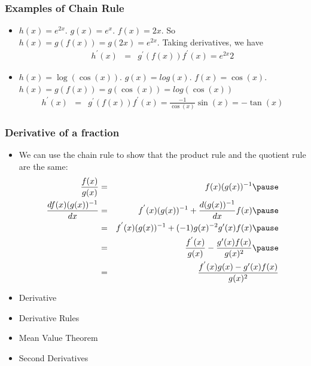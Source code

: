 \documentclass{beamer}
\numberwithin{equation}{section}
\begin{document}
\begin{frame}
\frametitle{Examples of Chain Rule}
\begin{itemize}
\item[-] $h(x) = e^{2x}$.  $g(x) = e^{x}$.  $f(x) = 2x$.  \pause So $h(x) = g(f(x)) = g(2x) = e^{2x}$.  Taking derivatives, we have \pause
\begin{eqnarray}
h^{'}(x) & = & g^{'}(f(x))f^{'}(x) = e^{2x}2 \nonumber 
\end{eqnarray} \pause
\item[-] $h(x) = \log(\cos(x) )$.  $g(x) = log(x)$.  $f(x) = \cos(x)$. \pause\\
 $h(x) = g(f(x)) = g( \cos(x)) = log(\cos(x))$  \pause
\begin{eqnarray}
h^{'}(x) & = & g^{'}(f(x))f^{'}(x) = \frac{-1}{\cos(x)} \sin(x) = -\tan (x) \nonumber 
\end{eqnarray}
\end{itemize}

\end{frame}

\begin{frame}
\frametitle{Derivative of a fraction}

\begin{itemize}
\item We can use the chain rule to show that the product rule and the quotient rule are the same:
\begin{eqnarray}
\frac{f(x) }{g(x) }& = &f(x) (g(x))^{-1} \nonumber \pause\\
 \frac{d f(x) (g(x))^{-1}}{dx}& = & f^{'}(x) (g(x))^{-1} +\frac{d(g(x))^{-1}}{dx} f(x)\nonumber  \pause\\
& = & f^{'}(x) (g(x))^{-1} +(-1)g(x)^{-2}g'(x) f(x) \nonumber  \pause\\
    & = & \frac{f^{'}(x)}{ g(x)} - \frac{g'(x) f(x)}{g(x)^{2}} \nonumber  \pause\\
        & = & \frac{f^{'}(x)g(x)-g'(x) f(x)}{g(x)^{2}} \nonumber 
  \end{eqnarray}
 \end{itemize}

\end{frame}



\begin{frame}

\begin{itemize}
\item \textcolor{mygray}{Derivative}
\item \textcolor{mygray}{Derivative Rules}
\item \textcolor{myblack}{Mean Value Theorem}
\item \textcolor{mygray}{Second Derivatives}
\end{itemize}

\end{frame}
\end{document}
